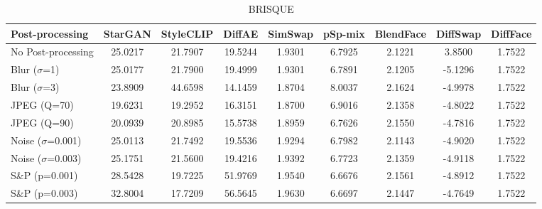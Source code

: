 \documentclass{article}
\begin{document}
\begin{table}[h!]
\begin{subtable}{\textwidth}
\caption{BRISQUE}
\centering
\scriptsize
\begin{tabular}{lcccccccc}
\toprule
\textbf{Post-processing} & StarGAN & StyleCLIP & DiffAE & SimSwap & pSp-mix & BlendFace & DiffSwap & DiffFace \\
\midrule
No Post-processing & 25.0217 & 21.7907 & 19.5244 & 1.9301 & 6.7925 & 2.1221 & 3.8500 & 1.7522 \\
\midrule
Blur ($\sigma$=1) & 25.0177 & 21.7900 & 19.4999 & 1.9301 & 6.7891 & 2.1205 & -5.1296 & 1.7522 \\
Blur ($\sigma$=3) & 23.8909 & 44.6598 & 14.1459 & 1.8704 & 8.0037 & 2.1624 & -4.9978 & 1.7522 \\
JPEG (Q=70) & 19.6231 & 19.2952 & 16.3151 & 1.8700 & 6.9016 & 2.1358 & -4.8022 & 1.7522 \\
JPEG (Q=90) & 20.0939 & 20.8985 & 15.5738 & 1.8959 & 6.7626 & 2.1550 & -4.7816 & 1.7522 \\
Noise ($\sigma$=0.001) & 25.0113 & 21.7492 & 19.5536 & 1.9294 & 6.7982 & 2.1143 & -4.9020 & 1.7522 \\
Noise ($\sigma$=0.003) & 25.1751 & 21.5600 & 19.4216 & 1.9392 & 6.7723 & 2.1359 & -4.9118 & 1.7522 \\
S\&P (p=0.001) & 28.5428 & 19.7225 & 51.9769 & 1.9540 & 6.6676 & 2.1561 & -4.8912 & 1.7522 \\
S\&P (p=0.003) & 32.8004 & 17.7209 & 56.5645 & 1.9630 & 6.6697 & 2.1447 & -4.7649 & 1.7522 \\
\bottomrule
\end{tabular}
\end{subtable}

\end{table}

\clearpage
\end{document}
